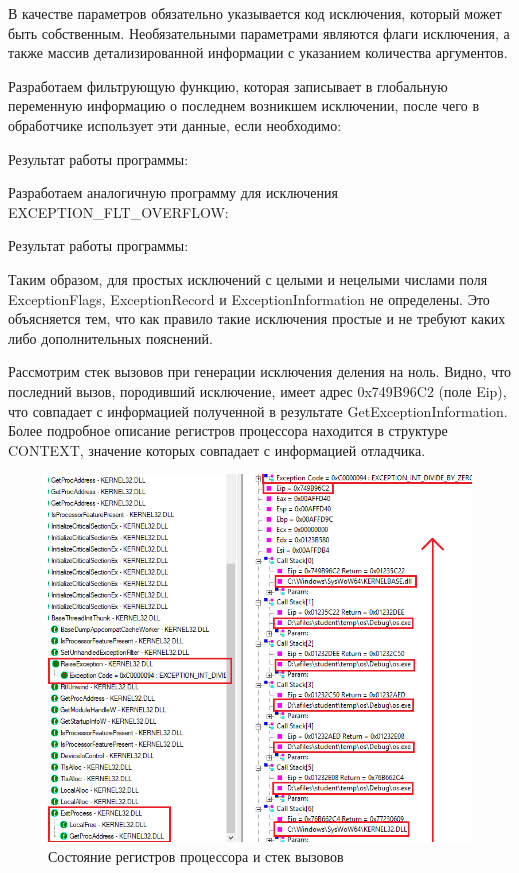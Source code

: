 \documentclass[14pt,a4paper,report]{report}
\begin{document}
В качестве параметров обязательно указывается код исключения, который может быть собственным. Необязательными параметрами являются флаги исключения, а также массив детализированной информации с указанием количества аргументов.

Разработаем фильтрующую функцию, которая записывает в глобальную переменную информацию о последнем возникшем исключении, после чего в обработчике использует эти данные, если необходимо:



Результат работы программы:



Разработаем аналогичную программу для исключения EXCEPTION\_FLT\_OVERFLOW:



Результат работы программы:



Таким образом, для простых исключений с целыми и нецелыми числами поля ExceptionFlags, ExceptionRecord и ExceptionInformation не определены. Это объясняется тем, что как правило такие исключения простые и не требуют каких либо дополнительных пояснений.

Рассмотрим стек вызовов при генерации исключения деления на ноль. Видно, что последний вызов, породивший исключение, имеет адрес 0x749B96C2 (поле Eip), что совпадает с информацией полученной в результате GetExceptionInformation. Более подробное описание регистров процессора находится в структуре CONTEXT, значение которых совпадает с информацией отладчика.

\begin{figure}[h!]
	\centering
	\includegraphics[scale = 0.70]{images/4.png}
	\caption{Состояние регистров процессора и стек вызовов}
\end{figure}
\end{document}
